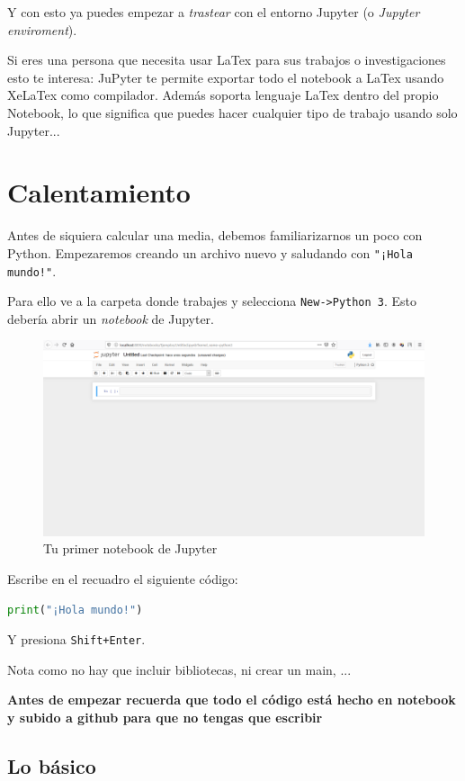 \documentclass[openany,a4paper]{book}
\begin{document}
Y con esto ya puedes empezar a \textit{trastear} con el entorno Jupyter (o \textit{Jupyter enviroment}).

Si eres una persona que necesita usar LaTex para sus trabajos o investigaciones esto te interesa: JuPyter te permite exportar todo el notebook a LaTex usando XeLaTex como compilador. Además soporta lenguaje LaTex dentro del propio Notebook, lo que significa que puedes hacer cualquier tipo de trabajo usando solo Jupyter...

\section{Calentamiento}

Antes de siquiera calcular una media, debemos familiarizarnos un poco con Python. Empezaremos creando un archivo nuevo y saludando con \texttt{"¡Hola mundo!"}.

Para ello ve a la carpeta donde trabajes y selecciona \texttt{New->Python 3}. Esto debería abrir un \textit{notebook} de Jupyter.

\begin{figure}[H]
    \centering
    \includegraphics[width=0.618\linewidth]{images/screenshots/jupyter/jupyter_init_notebook.png}
    \caption{Tu primer notebook de Jupyter}
\end{figure}

Escribe en el recuadro el siguiente código:
\begin{lstlisting}[language=Python]
    print("¡Hola mundo!")
\end{lstlisting}{}

Y presiona \texttt{Shift+Enter}.

Nota como no hay que incluir bibliotecas, ni crear un main, ...

\textbf{Antes de empezar recuerda que todo el código está hecho en notebook y subido a github para que no tengas que escribir}

\subsection{Lo básico}
\end{document}
